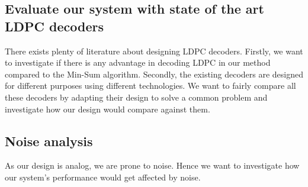 \subsection{Evaluate our system with state of the art LDPC decoders}

There exists plenty of literature about designing LDPC decoders. Firstly, we want to investigate if there is any advantage in decoding LDPC in our method compared to the Min-Sum algorithm. Secondly, the existing decoders are designed for different purposes using different technologies. We want to fairly compare all these decoders by adapting their design to solve a common problem and investigate how our design would compare against them.

\subsection{Noise analysis}

As our design is analog, we are prone to noise. Hence we want to investigate how our system's performance would get affected by noise. 


